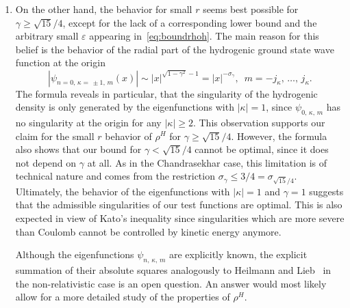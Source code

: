 \documentclass[10pt]{amsart}
\theoremstyle{definition}
\begin{document}
\begin{enumerate}
\item On the other hand, the behavior for small $r$ seems best possible for $\gamma\geq\sqrt{15}/4$, except for the lack of a corresponding lower bound and the arbitrary small $\varepsilon$ appearing in~\eqref{eq:boundrhoh}. The main reason for this belief is the behavior of the radial part of the hydrogenic ground state wave function at the origin
\[
\left|\psi_{n=0,\,\kappa=\,\pm1,\,m}(x)\right| \sim |x|^{\sqrt{1-\gamma^2}-1} = |x|^{-\sigma_\gamma}, \; \ m=-j_\kappa,\,\dots,\,j_\kappa.
\]
The formula reveals in particular, that the singularity of the hydrogenic density is only generated by the eigenfunctions with $|\kappa|=1$, since $\psi_{0,\,\kappa,\,m}$ has no singularity at the origin for any $|\kappa|\geq2$. This observation supports our claim for the small $r$ behavior of $\rho^H$ for $\gamma\geq\sqrt{15}/4$. However, the formula also shows that our bound for $\gamma<\sqrt{15}/4$ cannot be optimal, since it does not depend on $\gamma$ at all. As in the Chandrasekhar case, this limitation is of technical nature and comes from the restriction $\sigma_\gamma\leq3/4=\sigma_{\sqrt{15}/4}$. Ultimately, the behavior of the eigenfunctions with $|\kappa|=1$ and $\gamma=1$ suggests that the admissible singularities of our test functions are optimal. This is also expected in view of Kato's inequality since singularities which are more severe than Coulomb cannot be controlled by kinetic energy anymore.


Although the eigenfunctions $\psi_{n,\,\kappa,\,m}$ are explicitly known, the explicit summation of their absolute squares analogously to Heilmann and Lieb~\cite{HeilmannLieb1995} in the non-relativistic case is an open question. An answer would most likely allow for a more detailed study of the properties of $\rho^H$.


\end{enumerate}
\end{document}
